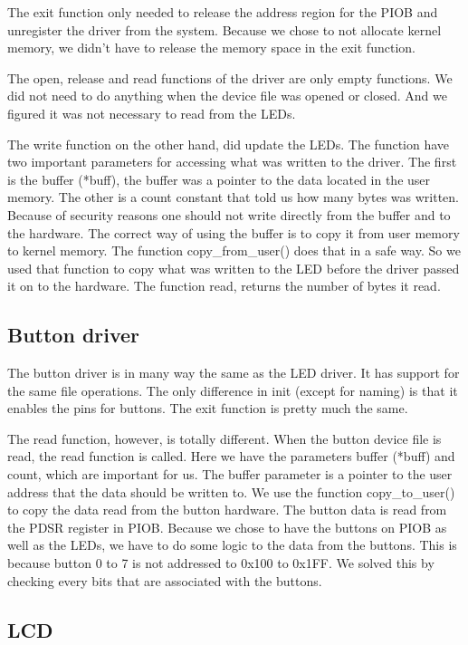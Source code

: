 \documentclass[12pt,a4paper,final]{report}
\numberwithin{equation}{section}
\numberwithin{table}{section}
\numberwithin{figure}{section}
\begin{document}
The exit function only needed to release the address region for the PIOB and unregister the driver from the system. Because we chose to not allocate kernel memory, we didn’t have to release the memory space in the exit function.

The open, release and read functions of the driver are only empty functions. We did not need to do anything when the device file was opened or closed. And we figured it was not necessary to read from the LEDs.

The write function on the other hand, did update the LEDs. The function have two important parameters for accessing what was written to the driver. The first is the buffer (*buff), the buffer was a pointer to the data located in the user memory. The other is a count constant that told us how many bytes was written. Because of security reasons one should not write directly from the buffer and to the hardware. The correct way of using the buffer is to copy it from user memory to kernel memory. The function copy\_from\_user() does that in a safe way. So we used that function to copy what was written to the LED before the driver passed it on to the hardware. The function read, returns the number of bytes it read.

\subsection{Button driver}
\label{sec:buttondriver}

The button driver is in many way the same as the LED driver. It has support for the same file operations. The only difference in init (except for naming) is that it enables the pins for buttons. The exit function is pretty much the same.

The read function, however, is totally different. When the button device file is read, the read function is called. Here we have the parameters buffer (*buff) and count, which are important for us. The buffer parameter is a pointer to the user address that the data should be written to. We use the function copy\_to\_user() to copy the data read from the button hardware. The button data is read from the PDSR register in PIOB. Because we chose to have the buttons on PIOB as well as the LEDs, we have to do some logic to the data from the buttons. This is because button 0 to 7 is not addressed to 0x100 to 0x1FF. We solved this by checking every bits that are associated with the buttons. 


\subsection{LCD}
\label{sec:lcd}
\end{document}

